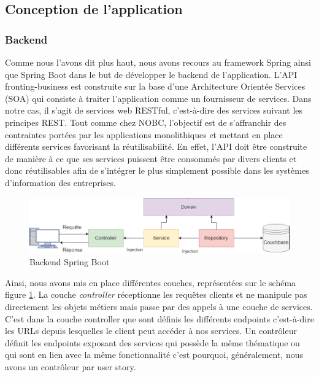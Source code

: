 \subsection{Conception de l'application}

\subsubsection{Backend}
	Comme nous l'avons dit plus haut, nous avons recours au framework Spring ainsi que Spring Boot dans le but de développer le backend de l'application. L'API fronting-business est construite sur la base d'une Architecture Orientée Services (SOA) qui consiste à traiter l'application comme un fournisseur de services. Dans notre cas, il s'agit de services web RESTful, c'est-à-dire des services suivant les principes REST. Tout comme chez NOBC, l'objectif est de s'affranchir des contraintes portées par les applications monolithiques et mettant en place différents services favorisant la réutilisabilité. En effet, l'API doit être construite de manière à ce que ses services puissent être consommés par divers clients et donc réutilisables afin de s'intégrer le plus simplement possible dans les systèmes d'information des entreprises. \\
	
\begin{figure}[h!]
	\includegraphics[scale=0.50]{images/travailBP1818/architecture/spring.png}
	\centering
	\caption{Backend Spring Boot}
	\label{spring}
\end{figure}
	
	Ainsi, nous avons mis en place différentes couches, représentées sur le schéma figure \ref{spring}. La couche \textit{controller} réceptionne les requêtes clients et ne manipule pas directement les objets métiers mais passe par des appels à une couche de services. C'est dans la couche controller que sont définis les différents endpoints c'est-à-dire les URLs depuis lesquelles le client peut accéder à nos services. Un contrôleur définit les endpoints exposant des services qui possède la même thématique ou qui sont en lien avec la même fonctionnalité c'est pourquoi, généralement, nous avons un contrôleur par user story. \\
	
